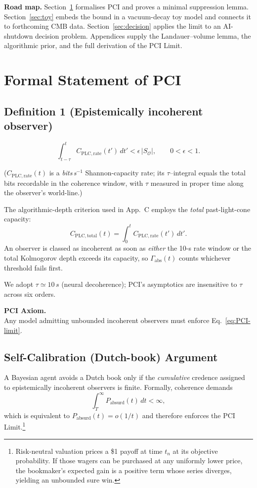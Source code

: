 \documentclass[12pt]{article}
\newcommand{\PCI}{PCI\xspace}
\begin{document}
\medskip
\noindent
\textbf{Road map.}  Section~\ref{sec:principle} formalises \PCI and proves a
minimal suppression lemma.  Section~\ref{sec:toy} embeds the bound in a
vacuum-decay toy model and connects it to forthcoming CMB data.  Section~\ref{sec:decision}
applies the limit to an AI-shutdown decision problem.  Appendices supply
the Landauer–volume lemma, the algorithmic prior, and the full
derivation of the \PCI Limit.

\section{Formal Statement of \PCI}\label{sec:principle}
\subsection*{Definition 1 (Epistemically incoherent observer)}
\[
  \int_{t-\tau}^{t} C_{\mathrm{PLC,rate}}(t')\,dt'
  < \epsilon\,\lvert S_{\mathcal O}\rvert,\qquad 0<\epsilon<1.
\]

\noindent\small
($C_{\mathrm{PLC,rate}}(t)$ is a \emph{bits\,s$^{-1}$} Shannon-capacity rate; its $\tau$–integral equals the total bits recordable in the
coherence window, with $\tau$ measured in proper time along the
observer’s world-line.)\par
\smallskip\noindent
The algorithmic-depth criterion used in App.~C employs the
\emph{total} past-light-cone capacity:
\[
  C_{\mathrm{PLC,total}}(t)=\int_{0}^{t} C_{\mathrm{PLC,rate}}(t')\,dt'.
\]
An observer is classed as incoherent as soon as \emph{either} the
10-s rate window or the total Kolmogorov depth exceeds its capacity,
so $\Gamma_{\text{abs}}(t)$ counts whichever threshold fails first.
\normalsize

We adopt $\tau\simeq10\,\si{s}$ (neural decoherence); \PCI’s asymptotics
are insensitive to $\tau$ across six orders.

\medskip\noindent\textbf{\PCI Axiom.}\\
Any model admitting unbounded incoherent observers must enforce
Eq.~\eqref{eq:PCI-limit}.

\subsection{Self-Calibration (Dutch-book) Argument}\label{subsec:selfcal}
A Bayesian agent avoids a Dutch book only if the \emph{cumulative}
credence assigned to epistemically incoherent observers is finite.
Formally, coherence demands
\[
   \int_{T}^{\infty} P_{\text{absurd}}(t)\,dt < \infty,
\]
which is equivalent to $P_{\text{absurd}}(t)=o(1/t)$ and therefore
enforces the \PCI Limit.\footnote{%
Risk-neutral valuation prices a \$1 payoff at time $t_n$ at its objective
probability.  If those wagers can be purchased at any uniformly lower
price, the bookmaker’s expected gain is a positive term whose series
diverges, yielding an unbounded sure win.}
\end{document}

